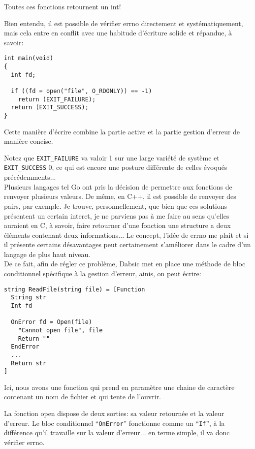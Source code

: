 \documentclass[a5paper, 12pt]{book}
\begin{document}
Toutes ces fonctions retournent un int!

Bien entendu, il est possible de vérifier errno directement
et systématiquement, mais cela entre en conflit avec
une habitude d'écriture solide et répandue, à savoir:\\

\begin{verbatim}
int main(void)
{
  int fd;

  if ((fd = open("file", O_RDONLY)) == -1)
    return (EXIT_FAILURE);
  return (EXIT_SUCCESS);
}
\end{verbatim}

Cette manière d'écrire combine la partie active et
la partie gestion d'erreur de manière concise.

Notez que \verb!EXIT_FAILURE! va valoir 1 sur une large
variété de système et \verb!EXIT_SUCCESS! 0, ce qui est
encore une posture différente de celles évoqués
précédemments...
\\
Plusieurs langages tel Go ont pris la décision
de permettre aux fonctions de renvoyer plusieurs
valeurs. De même, en C++, il est possible de renvoyer
des pairs, par exemple.
Je trouve, personnellement, que bien que ces solutions
présentent un certain interet, je ne parviens pas à
me faire au sens qu'elles auraient en C, à savoir,
faire retourner d'une fonction une structure a deux éléments
contenant deux informations...
Le concept, l'idée de errno me plait et si il
présente certains désavantages peut certainement
s'améliorer dans le cadre d'un langage de plus
haut niveau.
\\
De ce fait, afin de régler ce problème, Dabsic met en place
une méthode de bloc conditionnel spécifique à
la gestion d'erreur, ainis, on peut écrire:\\

\begin{verbatim}
string ReadFile(string file) = [Function
  String str
  Int fd

  OnError fd = Open(file)
    "Cannot open file", file
    Return ""
  EndError
  ...
  Return str
]
\end{verbatim}

Ici, nous avons une fonction qui prend en paramètre une
chaine de caractère contenant un nom de fichier et
qui tente de l'ouvrir.

La fonction open dispose de deux sorties: sa valeur
retournée et la valeur d'erreur. Le bloc conditionnel
``\verb!OnError!'' fonctionne comme un ``\verb!If!'', à la différence
qu'il travaille sur la valeur d'erreur... en terme
simple, il va donc vérifier errno.
\end{document}
